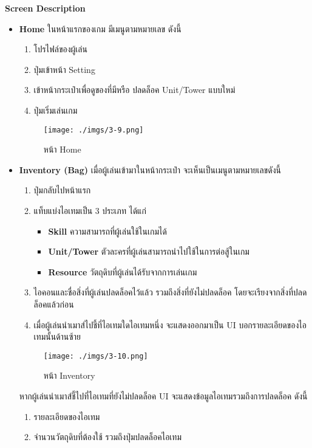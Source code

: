 \documentclass[12pt,oneside,openright,a4paper]{cpe-thai-project}
\begin{document}
\pagebreak
\textbf{Screen Description}
\begin{itemize}
  \item \textbf{Home} ในหน้าแรกของเกม มีเมนูตามหมายเลข ดังนี้
  \begin{enumerate}
    \item โปรไฟล์ของผู้เล่น
    \item ปุ่มเข้าหน้า Setting
    \item เข้าหน้ากระเป๋าเพื่อดูของที่มีหรือ ปลดล็อค Unit/Tower แบบใหม่
    \item ปุ่มเริ่มเล่นเกม
  \end{enumerate}

  \begin{figure}[H]\centering
    \texttt{[image: ./imgs/3-9.png]}
    \caption{หน้า Home}\label{fig:3-9}
  \end{figure}

  \item \textbf{Inventory (Bag)} เมื่อผู้เล่นเข้ามาในหน้ากระเป๋า 
  จะเห็นเป็นเมนูตามหมายเลขดังนี้
  \begin{enumerate}
    \item ปุ่มกลับไปหน้าแรก
    \item แท็บแบ่งไอเทมเป็น 3 ประเภท ได้แก่
    \begin{itemize}
      \item \textbf{Skill} ความสามารถที่ผู้เล่นใช้ในเกมได้
      \item \textbf{Unit/Tower} ตัวละครที่ผู้เล่นสามารถนำไปใช้ในการต่อสู้ในเกม
      \item \textbf{Resource} วัตถุดิบที่ผู้เล่นได้รับจากการเล่นเกม
    \end{itemize}
    \item ไอคอนและชื่อสิ่งที่ผู้เล่นปลดล็อคไว้แล้ว 
    รวมถึงสิ่งที่ยังไม่ปลดล็อค โดยจะเรียงจากสิ่งที่ปลดล็อคแล้วก่อน
    \item เมื่อผู้เล่นนำเมาส์ไปชี้ที่ไอเทมใดไอเทมหนึ่ง 
    จะแสดงออกมาเป็น UI บอกรายละเอียดของไอเทมนั้นด้านซ้าย
  \end{enumerate}

  \begin{figure}[H]\centering
    \texttt{[image: ./imgs/3-10.png]}
    \caption{หน้า Inventory}\label{fig:3-10}
  \end{figure}

  \pagebreak
  หากผู้เล่นนำเมาส์ชี้ไปที่ไอเทมที่ยังไม่ปลดล็อค UI 
  จะแสดงข้อมูลไอเทมรวมถึงการปลดล็อค ดังนี้
  \begin{enumerate}
    \item รายละเอียดของไอเทม
    \item จำนวนวัตถุดิบที่ต้องใช้ รวมถึงปุ่มปลดล็อคไอเทม
  \end{enumerate}


\end{itemize}
\end{document}
